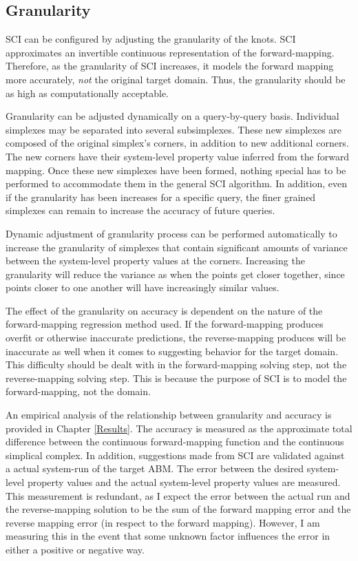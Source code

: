 \subsection{Granularity}
\label{subsec:granularity}

SCI can be configured by adjusting the granularity of the knots.
SCI approximates an invertible continuous representation of the forward-mapping.
Therefore, as the granularity of SCI increases, it models the forward mapping more accurately, \textit{not} the original target domain.
Thus, the granularity should be as high as computationally acceptable.

Granularity can be adjusted dynamically on a query-by-query basis.
Individual simplexes may be separated into several subsimplexes.
These new simplexes are composed of the original simplex's corners, in addition to new additional corners.
The new corners have their system-level property value inferred from the forward mapping.
Once these new simplexes have been formed, nothing special has to be performed to accommodate them in the general SCI algorithm.
In addition, even if the granularity has been increases for a specific query, the finer grained simplexes can remain to increase the accuracy of future queries.

Dynamic adjustment of granularity process can be performed automatically to increase the granularity of simplexes that contain significant amounts of variance between the system-level property values at the corners.
Increasing the granularity will reduce the variance as when the points get closer together, since points closer to one another will have increasingly similar values.

The effect of the granularity on accuracy is dependent on the nature of the forward-mapping regression method used.
If the forward-mapping produces overfit or otherwise inaccurate predictions, the reverse-mapping produces will be inaccurate as well when it comes to suggesting behavior for the target domain.
This difficulty should be dealt with in the forward-mapping solving step, not the reverse-mapping solving step.
This is because the purpose of SCI is to model the forward-mapping, not the domain.

An empirical analysis of the relationship between granularity and accuracy is provided in Chapter \ref{Results}.
The accuracy is measured as the approximate total difference between the continuous forward-mapping function and the continuous simplical complex.
In addition, suggestions made from SCI are validated against a actual system-run of the target ABM.
The error between the desired system-level property values and the actual system-level property values are measured.
This measurement is redundant, as I expect the error between the actual run and the reverse-mapping solution to be the sum of the forward mapping error and the reverse mapping error (in respect to the forward mapping).
However, I am measuring this in the event that some unknown factor influences the error in either a positive or negative way.


